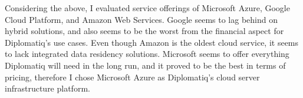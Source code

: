 Considering the above, I evaluated service offerings of Microsoft Azure, Google Cloud Platform, and Amazon Web Services. Google seems to lag behind on hybrid solutions, and also seems to be the worst from the financial aspect for Diplomatiq's use cases. Even though Amazon is the oldest cloud service, it seems to lack integrated data residency solutions. Microsoft seems to offer everything Diplomatiq will need in the long run, and it proved to be the best in terms of pricing, therefore I chose Microsoft Azure as Diplomatiq's cloud server infrastructure platform.
